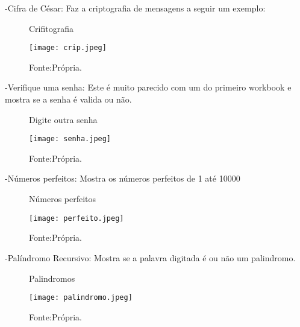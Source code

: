 -Cifra de César:
Faz a criptografia de mensagens a seguir um exemplo:

\begin{figure} [h!]	
    \centering
    \caption{Crifitografia}
    \texttt{[image: crip.jpeg]}
    \caption*{Fonte:Própria.}
    \label{fig:criptografia}
\end{figure}

-Verifique uma senha:
Este é muito parecido com um do primeiro workbook e mostra se a senha é valida ou não.

\begin{figure} [h!]	
    \centering
    \caption{Digite outra senha}
    \texttt{[image: senha.jpeg]}
    \caption*{Fonte:Própria.}
    \label{fig:Senha}
\end{figure}

-Números perfeitos:
Mostra os números perfeitos de 1 até 10000

\begin{figure} [h!]	
    \centering
    \caption{Números perfeitos}
    \texttt{[image: perfeito.jpeg]}
    \caption*{Fonte:Própria.}
    \label{fig:Numerosperfeitos}
\end{figure}

-Palíndromo Recursivo:
Mostra se a palavra digitada é ou não um palindromo.
\begin{figure} [h!]	
    \centering
    \caption{Palindromos}
    \texttt{[image: palindromo.jpeg]}
    \caption*{Fonte:Própria.}
    \label{fig:palindromo}
\end{figure}
